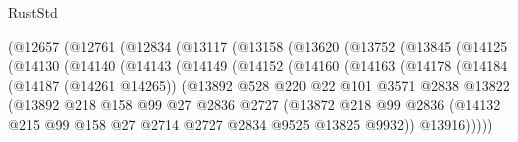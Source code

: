 \begin{lexlean}{RustStd}
\begin{coremodule}
              (@12657
                (@12761
                  (@12834
                    (@13117
                      (@13158
                        (@13620
                          (@13752
                            (@13845
                              (@14125
                                (@14130
                                  (@14140
                                    (@14143
                                      (@14149
                                        (@14152
                                          (@14160
                                            (@14163
                                              (@14178
                                                (@14184
                                                  (@14187 (@14261 @14265))
                                                  (@13892
                                                    @528
                                                    @220
                                                    @22
                                                    @101
                                                    @3571
                                                    @2838
                                                    @13822
                                                    (@13892
                                                      @218
                                                      @158
                                                      @99
                                                      @27
                                                      @2836
                                                      @2727
                                                      (@13872
                                                        @218
                                                        @99
                                                        @2836
                                                        (@14132
                                                          @215
                                                          @99
                                                          @158
                                                          @27
                                                          @2714
                                                          @2727
                                                          @2834
                                                          @9525
                                                          @13825
                                                          @9932))
                                                      @13916)))))

\end{coremodule}
\end{lexlean}
